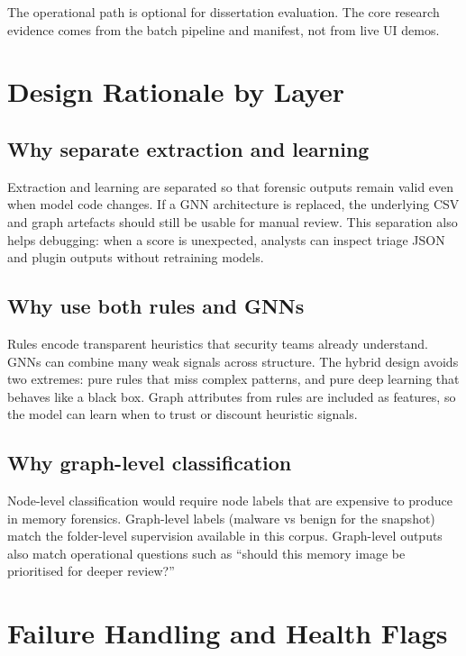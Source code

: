 The operational path is optional for dissertation evaluation. The core research evidence comes from the batch pipeline and manifest, not from live UI demos.

\section{Design Rationale by Layer}

\subsection{Why separate extraction and learning}

Extraction and learning are separated so that forensic outputs remain valid even when model code changes. If a GNN architecture is replaced, the underlying CSV and graph artefacts should still be usable for manual review. This separation also helps debugging: when a score is unexpected, analysts can inspect triage JSON and plugin outputs without retraining models.

\subsection{Why use both rules and GNNs}

Rules encode transparent heuristics that security teams already understand. GNNs can combine many weak signals across structure. The hybrid design avoids two extremes: pure rules that miss complex patterns, and pure deep learning that behaves like a black box. Graph attributes from rules are included as features, so the model can learn when to trust or discount heuristic signals.

\subsection{Why graph-level classification}

Node-level classification would require node labels that are expensive to produce in memory forensics. Graph-level labels (malware vs benign for the snapshot) match the folder-level supervision available in this corpus. Graph-level outputs also match operational questions such as ``should this memory image be prioritised for deeper review?''

\section{Failure Handling and Health Flags}

